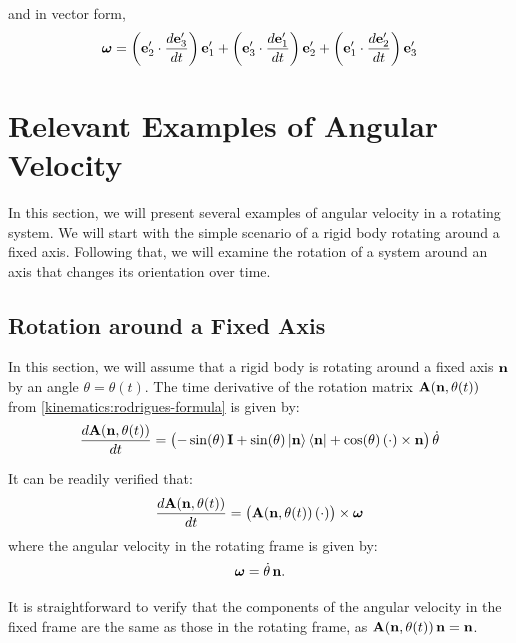 \documentclass[12pt]{article}
\begin{document}
and in vector form,
\begin{equation}
  \boldsymbol{\omega} =
    \left(\vb{e}'_2 \cdot \frac{d\vb{e}'_3}{dt}\right)\vb{e}'_1
  + \left(\vb{e}'_3 \cdot \frac{d\vb{e}'_1}{dt}\right)\vb{e}'_2
  + \left(\vb{e}'_1 \cdot \frac{d\vb{e}'_2}{dt}\right)\vb{e}'_3
  \label{kinematics:angular-velocity-components}
\end{equation}

\section{Relevant Examples of Angular Velocity}

In this section, we will present several examples of angular velocity in a rotating system.
We will start with the simple scenario of a rigid body rotating around a fixed axis. Following
that, we will examine the rotation of a system around an axis that changes its orientation
over time.

\subsection{Rotation around a Fixed Axis}

In this section, we will assume that a rigid body is rotating around a fixed axis $\vb{n}$
by an angle $\theta = \theta(t)$. The time derivative of the rotation matrix
$\vb{A}(\vb{n}, \theta(t))$ from \eqref{kinematics:rodrigues-formula} is given by:
\begin{equation}
  \frac{d\vb{A}(\vb{n},\theta(t))}{dt} =
  \bigl(-\sin(\theta)\,\vb{I} + \sin(\theta)\ket{\vb{n}}\bra{\vb{n}} + \cos(\theta)\,(\cdot)\times\vb{n}\bigr)\,\dot\theta
\end{equation}

It can be readily verified that:
\begin{equation}
  \frac{d\vb{A}(\vb{n},\theta(t))}{dt} = \bigl(\vb{A}(\vb{n},\theta(t))\,(\cdot)\bigr) \times \boldsymbol{\omega}
\end{equation}
where the angular velocity in the rotating frame is given by:
\begin{equation}
  \boldsymbol{\omega} = \dot\theta\,\vb{n}.
  \label{kinematics:fixed-axis-angular-velocity}
\end{equation}

It is straightforward to verify that the components of the angular velocity in the fixed
frame are the same as those in the rotating frame, as
$\vb{A}(\vb{n},\theta(t))\,\vb{n} = \vb{n}$.
\end{document}
